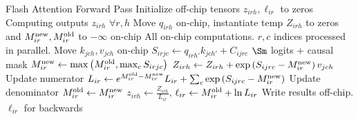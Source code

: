 \documentclass[11pt]{article}
\begin{document}
\begin{algo}{Flash Attention Forward Pass}
\State Initialize off-chip tensors $ z _{ irh },  \ell _{ ir }$ to zeros \Comment Computing outputs $ z _{ irh } $ $ \forall r, h $
\State Move  $ q _{ irh }$ on-chip, instantiate temp $Z _{ irh }$ to zeros and $ M ^{ {\rm new} } _{ ir }, M ^{ {\rm old} } _{ ir } $ to $ -\infty $ on-chip
 \Comment All on-chip computations. $ r, c $ indices processed in parallel.
    \State Move  $ k_{ jch },v _{ jch }$ on-chip
    \State $ S _{ irjc } \gets   q _{ irh' } k _{ jch' } + C _{ ijrc } $ \Comment $ \Sm $ logits + causal mask
    \State $ M ^{ {\rm new} } _{ ir } \gets  \max \left ( M ^{ {\rm  old} } _{ ir }, \max_{ c }  S _{ irjc }  \right )   $
    \State $ Z _{ irh } \gets   Z _{ irh } +\exp \left (  S _{ ijrc } - M ^{ {\rm  new} } _{ ir }  \right ) v _{ jch }$ \Comment Update numerator
    \State $ L _{ ir } \gets   e ^{ M ^{ {\rm old} } _{ ir } - M ^{ {\rm  new} } _{ ir } } L _{ ir } +\sum _{ c }\exp \left (   S _{ ijrc } - M ^{ {\rm  new} } _{ ir }   \right ) $ \Comment Update denominator
    \State $ M ^{ {\rm old} } _{ ir } \gets  M ^{ {\rm  new} } _{ ir }   $
\EndFor
\State $ z _{ irh } \gets \frac{Z _{ irh }}{L _{ ir }}$, $  \ell _{ ir } \gets M ^{ {\rm old} } _{ ir } + \ln L _{ ir }$ \Comment Write results off-chip. $ \ell _{ ir } $ for backwards
\EndFor
\label{algo_fa_fwd_advanced}
\end{algo}
\end{document}

